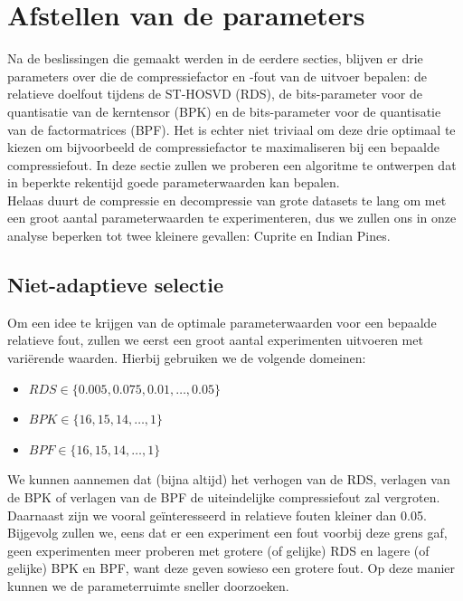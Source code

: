 \section{Afstellen van de parameters}
\label{sec:parameters}

Na de beslissingen die gemaakt werden in de eerdere secties, blijven er drie parameters over die de compressiefactor en -fout van de uitvoer bepalen: de relatieve doelfout tijdens de ST-HOSVD (RDS), de bits-parameter voor de quantisatie van de kerntensor (BPK) en de bits-parameter voor de quantisatie van de factormatrices (BPF). Het is echter niet triviaal om deze drie optimaal te kiezen om bijvoorbeeld de compressiefactor te maximaliseren bij een bepaalde compressiefout. In deze sectie zullen we proberen een algoritme te ontwerpen dat in beperkte rekentijd goede parameterwaarden kan bepalen.\\

Helaas duurt de compressie en decompressie van grote datasets te lang om met een groot aantal parameterwaarden te experimenteren, dus we zullen ons in onze analyse beperken tot twee kleinere gevallen: Cuprite en Indian Pines.

\newpage
\subsection{Niet-adaptieve selectie}

Om een idee te krijgen van de optimale parameterwaarden voor een bepaalde relatieve fout, zullen we eerst een groot aantal experimenten uitvoeren met vari\"erende waarden. Hierbij gebruiken we de volgende domeinen:

\begin{itemize}
\item $RDS \in \{0.005, 0.075, 0.01, \dots, 0.05\}$
\item $BPK \in \{16, 15, 14, \dots, 1\}$
\item $BPF \in \{16, 15, 14, \dots, 1\}$
\end{itemize}

We kunnen aannemen dat (bijna altijd) het verhogen van de RDS, verlagen van de BPK of verlagen van de BPF de uiteindelijke compressiefout zal vergroten. Daarnaast zijn we vooral ge\"interesseerd in relatieve fouten kleiner dan 0.05. Bijgevolg zullen we, eens dat er een experiment een fout voorbij deze grens gaf, geen experimenten meer proberen met grotere (of gelijke) RDS en lagere (of gelijke) BPK en BPF, want deze geven sowieso een grotere fout. Op deze manier kunnen we de parameterruimte sneller doorzoeken.

